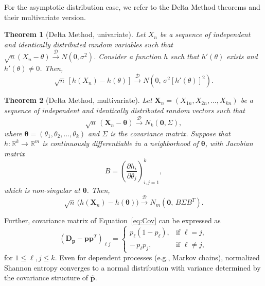 For the asymptotic distribution case, we refer to the Delta Method theorems and their multivariate version.

\theoremstyle{plain}
\newtheorem{theorem}{Theorem}

\begin{theorem}[Delta Method, univariate]
	Let $X_n$ be a sequence of independent and identically distributed random variables such that 
	$\sqrt{n}(X_n - \theta) \xrightarrow{\mathscr{D}} N(0,\sigma^2)$. 
	Consider a function $h$ such that $h'(\theta)$ exists and $h'(\theta)\neq 0$. 
	Then,
	\[
	\sqrt{n}\,[h(X_n)-h(\theta)] \xrightarrow{\mathscr{D}} N\!\left(0,\,\sigma^2 [h'(\theta)]^2\right).
	\]
\end{theorem}

\begin{theorem}[Delta Method, multivariate]
	Let $\mathbf{X}_n= (X_{1n}, X_{2n}, \dots, X_{kn})$ be a sequence of independent and identically distributed random vectors such that 
	\[
	\sqrt{n}\,(\mathbf{X}_n - \boldsymbol{\theta}) \xrightarrow{\mathscr{D}} N_k(\mathbf{0},\Sigma),
	\]
	where $\boldsymbol{\theta} = (\theta_1,\theta_2,\dots,\theta_k)$ and $\Sigma$ is the covariance matrix. 
	Suppose that $h\colon\mathbb{R}^k \to \mathbb{R}^m$ is continuously differentiable in a neighborhood of $\boldsymbol{\theta}$, with Jacobian matrix
	\[
	B = \left( \frac{\partial h_i}{\partial \theta_j} \right)_{i,j=1}^k,
	\]
	which is non-singular at $\boldsymbol{\theta}$. Then,
	\[
	\sqrt{n}\,\big(h(\mathbf{X}_n)-h(\boldsymbol{\theta})\big) \xrightarrow{\mathscr{D}} N_m\!\left(\mathbf{0},\, B \Sigma B^T\right).
	\]
\end{theorem}

Further, covariance matrix of Equation~\eqref{eq:Cov} can be expressed as 
\begin{equation}
	(\mathbf{D_p}-\mathbf{pp}^T)_{\ell j} =
	\begin{cases}
		p_{\ell}(1-p_{\ell}), & \text{if } \ell = j, \\[6pt]
		-\,p_{\ell}p_{j}, & \text{if } \ell \neq j,
	\end{cases}
\end{equation}
for $1\leq {\ell}, j\leq k.$
Even for dependent processes (e.g., Markov chains), normalized Shannon entropy converges to a normal distribution with variance determined by the covariance structure of $\widehat{\mathbf{p}}$. 

